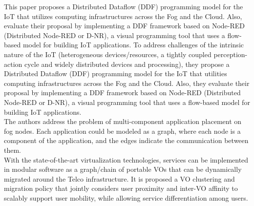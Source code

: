 \cite{giang2015developing}
This paper proposes a Distributed Dataflow (DDF) programming model for the IoT that utilizes computing infrastructures across the Fog and the Cloud. Also, evaluate their proposal by implementing a DDF framework based on Node-RED (Distributed Node-RED or D-NR), a visual programming tool that uses a flow-based model for building IoT applications. To address challenges of the intrinsic nature of the IoT (heterogeneous devices/resources, a tightly coupled perception-action cycle and widely distributed devices and processing), they propose a Distributed Dataflow (DDF) programming model for the IoT that utilities computing infrastructures across the Fog and the Cloud. Also, they evaluate their proposal by implementing a DDF framework based on Node-RED (Distributed Node-RED or D-NR), a visual programming tool that uses a flow-based model for building IoT applications.\\

\cite{bahreini2017efficient}
The authors address the problem of multi-component application placement on fog nodes. Each application could be modeled as a graph, where each node is a component of the application, and the edges indicate the communication between them.\\


\cite{bruschi2018move}
With the state-of-the-art virtualization technologies, services can be implemented in modular software as a graph/chain of portable VOs that can be dynamically migrated around the Telco infrastructure. It is proposed a VO clustering and migration policy that jointly considers user proximity and inter-VO affinity to scalably support user mobility, while allowing service differentiation among users.\\

